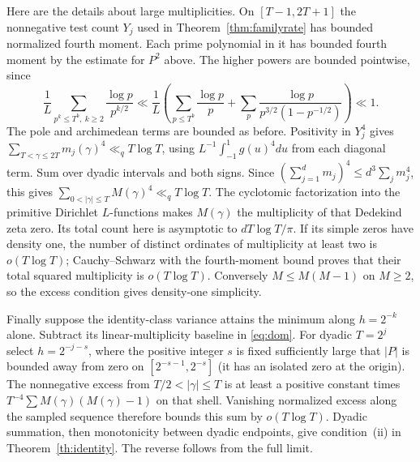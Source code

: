 \documentclass[11pt]{article}
\begin{document}
Here are the details about large multiplicities. On $[T-1,2T+1]$ the
nonnegative test count $Y_j$ used in Theorem~\ref{thm:familyrate} has
bounded normalized fourth moment. Each prime polynomial in it has bounded
fourth moment by the estimate for $P^2$ above. The higher powers are
bounded pointwise, since
\[
 \frac1L\sum_{p^k\le T^b,\ k\ge2}\frac{\log p}{p^{k/2}}
 \ll \frac1L\left(\sum_{p\le T^b}\frac{\log p}{p}
       +\sum_p\frac{\log p}{p^{3/2}(1-p^{-1/2})}\right)\ll1.
\]
The pole and archimedean terms are bounded as before. Positivity in
$Y_j^4$ gives $\sum_{T<\gamma\le2T}m_j(\gamma)^4\ll_q T\log T$,
using $L^{-1}\int_{-1}^1g(u)^4du$ from each diagonal term. Sum over
dyadic intervals and both signs. Since $(\sum_{j=1}^dm_j)^4\le
d^3\sum_jm_j^4$, this gives
$\sum_{0<|\gamma|\le T} M(\gamma)^4\ll_q T\log T$.
The cyclotomic factorization into the primitive Dirichlet $L$-functions
makes $M(\gamma)$ the multiplicity of that Dedekind zeta zero.
Its total count here is asymptotic to $dT\log T/\pi$.
If its simple zeros have density one, the number of distinct ordinates
of multiplicity at least two is $o(T\log T)$; Cauchy--Schwarz with the
fourth-moment bound proves that their total squared multiplicity is
$o(T\log T)$. Conversely $M\le M(M-1)$ on $M\ge2$, so the
excess condition gives density-one simplicity.

Finally suppose the identity-class variance attains the minimum along
$h=2^{-k}$ alone. Subtract its linear-multiplicity baseline in
\eqref{eq:dom}. For dyadic $T=2^j$ select $h=2^{-j-s}$, where the
positive integer $s$ is fixed sufficiently large that $|P|$ is bounded
away from zero on $[2^{-s-1},2^{-s}]$ (it has an isolated zero at the
origin). The nonnegative excess from $T/2<|\gamma|\le T$ is at least
a positive constant times $T^{-4}\sum M(\gamma)(M(\gamma)-1)$ on
that shell. Vanishing normalized excess along the sampled sequence
therefore bounds this sum by $o(T\log T)$. Dyadic summation, then
monotonicity between dyadic endpoints, give condition~(ii) in
Theorem~\ref{th:identity}. The reverse follows from the full limit.
\end{document}
